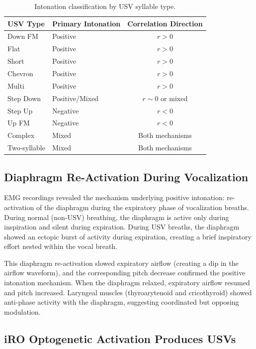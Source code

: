 \documentclass[11pt]{article}
\begin{document}
\begin{table}[h]
\centering
\caption{Intonation classification by USV syllable type.}
\label{tab:intonation}
\begin{tabular}{llc}
\toprule
USV Type & Primary Intonation & Correlation Direction \\
\midrule
Down FM & Positive & $r > 0$ \\
Flat & Positive & $r > 0$ \\
Short & Positive & $r > 0$ \\
Chevron & Positive & $r > 0$ \\
Multi & Positive & $r > 0$ \\
Step Down & Positive/Mixed & $r \sim 0$ or mixed \\
Step Up & Negative & $r < 0$ \\
Up FM & Negative & $r < 0$ \\
Complex & Mixed & Both mechanisms \\
Two-syllable & Mixed & Both mechanisms \\
\bottomrule
\end{tabular}
\end{table}

\subsection{Diaphragm Re-Activation During Vocalization}

EMG recordings revealed the mechanism underlying positive intonation: re-activation of the diaphragm during the expiratory phase of vocalization breaths. During normal (non-USV) breathing, the diaphragm is active only during inspiration and silent during expiration. During USV breaths, the diaphragm showed an ectopic burst of activity during expiration, creating a brief inspiratory effort nested within the vocal breath.

This diaphragm re-activation slowed expiratory airflow (creating a dip in the airflow waveform), and the corresponding pitch decrease confirmed the positive intonation mechanism. When the diaphragm relaxed, expiratory airflow resumed and pitch increased. Laryngeal muscles (thyroarytenoid and cricothyroid) showed anti-phase activity with the diaphragm, suggesting coordinated but opposing modulation.

\subsection{iRO Optogenetic Activation Produces USVs}
\end{document}
